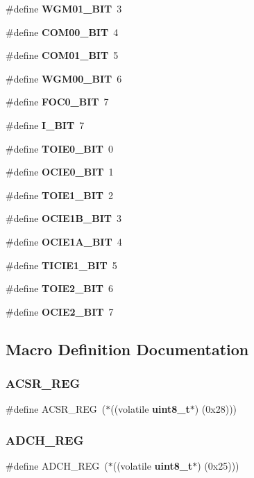 \begin{DoxyCompactItemize}
\#define \textbf{ W\+G\+M01\+\_\+\+B\+IT}~3
\item 
\#define \textbf{ C\+O\+M00\+\_\+\+B\+IT}~4
\item 
\#define \textbf{ C\+O\+M01\+\_\+\+B\+IT}~5
\item 
\#define \textbf{ W\+G\+M00\+\_\+\+B\+IT}~6
\item 
\#define \textbf{ F\+O\+C0\+\_\+\+B\+IT}~7
\item 
\#define \textbf{ I\+\_\+\+B\+IT}~7
\item 
\#define \textbf{ T\+O\+I\+E0\+\_\+\+B\+IT}~0
\item 
\#define \textbf{ O\+C\+I\+E0\+\_\+\+B\+IT}~1
\item 
\#define \textbf{ T\+O\+I\+E1\+\_\+\+B\+IT}~2
\item 
\#define \textbf{ O\+C\+I\+E1\+B\+\_\+\+B\+IT}~3
\item 
\#define \textbf{ O\+C\+I\+E1\+A\+\_\+\+B\+IT}~4
\item 
\#define \textbf{ T\+I\+C\+I\+E1\+\_\+\+B\+IT}~5
\item 
\#define \textbf{ T\+O\+I\+E2\+\_\+\+B\+IT}~6
\item 
\#define \textbf{ O\+C\+I\+E2\+\_\+\+B\+IT}~7
\end{DoxyCompactItemize}


\subsection{Macro Definition Documentation}
\mbox{\label{atmega32_8h_a06ee4dc38eb5afca3c47057fa18d2900}} 
\subsubsection{A\+C\+S\+R\+\_\+\+R\+EG}
{\footnotesize\ttfamily \#define A\+C\+S\+R\+\_\+\+R\+EG~($\ast$((volatile \textbf{ uint8\+\_\+t}$\ast$) (0x28)))}

\mbox{\label{atmega32_8h_aac5454fff761234931101ac2a6f2deb5}} 
\subsubsection{A\+D\+C\+H\+\_\+\+R\+EG}
{\footnotesize\ttfamily \#define A\+D\+C\+H\+\_\+\+R\+EG~($\ast$((volatile \textbf{ uint8\+\_\+t}$\ast$) (0x25)))}


